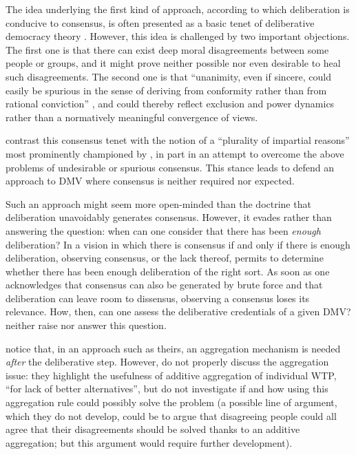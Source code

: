 \documentclass[version=3.21, pagesize, twoside=off, bibliography=totoc, DIV=calc, fontsize=12pt, a4paper, french, english]{scrartcl}
\begin{document}
The idea underlying the first kind of approach, according to which deliberation is conducive to consensus, is often presented as a basic tenet of deliberative democracy theory \citep{wilson_discourse-based_2002}. 
However, this idea is challenged by two important objections.
The first one is that there can exist deep moral disagreements \citep{dryzek_deliberative_2013} between some people or groups, and it might prove neither possible nor even desirable to heal such disagreements.
The second one is that “unanimity, even if sincere, could easily be spurious in the sense of deriving from conformity rather than from rational conviction” \citep{elster_sour_1983}, and could thereby reflect exclusion and power dynamics \citep{volker_exploring_2016,vargas_background_2016,vargas_problem_2017} rather than a normatively meaningful convergence of views.

\citeauthor{bartkowski_beyond_2018} contrast this consensus tenet with the notion of a ``plurality of impartial reasons'' most prominently championed by \citet{sen_idea_2009}, in part in an attempt to overcome the above problems of undesirable or spurious consensus.
This stance leads \citeauthor{bartkowski_beyond_2018} to defend an approach to DMV where consensus is neither required nor expected. 

Such an approach might seem more open-minded than the doctrine that deliberation unavoidably generates consensus. However, it evades rather than answering the question: when can one consider that there has been \emph{enough} deliberation? 
In a vision in which there is consensus if and only if there is enough deliberation, observing consensus, or the lack thereof, permits to determine whether there has been enough deliberation of the right sort. 
As soon as one acknowledges that consensus can also be generated by brute force and that deliberation can leave room to dissensus, observing a consensus loses its relevance. 
How, then, can one assess the deliberative credentials of a given DMV? 
\citeauthor{bartkowski_beyond_2018} neither raise nor answer this question.

\citeauthor{bartkowski_beyond_2018} notice that, in an approach such as theirs, an aggregation mechanism is needed \emph{after} the deliberative step.
However, \citeauthor{bartkowski_beyond_2018} do not properly discuss the aggregation issue: they highlight the usefulness of additive aggregation of individual WTP, ``for lack of better alternatives'', but do not investigate if and how using this aggregation rule could possibly solve the problem (a possible line of argument, which they do not develop, could be to argue that disagreeing people could all agree that their disagreements should be solved thanks to an additive aggregation; but this argument would require further development).
\end{document}
